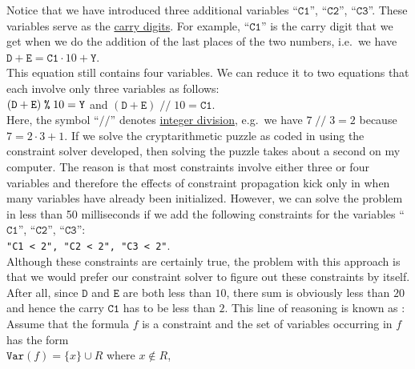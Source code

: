 Notice that we have introduced three additional variables ``$\texttt{C1}$'', ``$\texttt{C2}$'', ``$\texttt{C3}$''. 
These variables serve as the \href{https://en.wikipedia.org/wiki/Carry_(arithmetic)}{carry digits}.  For
example, ``$\texttt{C1}$'' is the carry digit that we get when we do the addition of the last places of the two
numbers, i.e.~we have
\\[0.2cm]
\hspace*{1.3cm}
$\texttt{D} + \texttt{E} = \texttt{C1} \cdot 10 + \texttt{Y}$.
\\[0.2cm]
This equation still contains four variables.  We can reduce it to two equations that each involve only three
variables as follows:
\\[0.2cm]
\hspace*{1.3cm}
$(\texttt{D} + \texttt{E})\; \texttt{\symbol{37}}\; 10 = \texttt{Y}$ \quad and \quad
$(\texttt{D} + \texttt{E}) \;\texttt{//}\; 10 = \texttt{C1}$.
\\[0.2cm]
Here, the symbol ``$\texttt{//}$'' denotes 
\href{https://en.wikipedia.org/wiki/Division_(mathematics)#Of_integers}{integer division}, 
e.g.~we have $7 \;\texttt{//}\; 3 = 2$ because $7 = 2 \cdot 3 + 1$.
If we solve the cryptarithmetic puzzle as coded in  using the
constraint solver developed, then solving the puzzle takes about
a second on my computer.  The reason is that most constraints involve either three or four variables and
therefore the effects of constraint propagation kick only in when many variables have already been initialized.
However, we can solve the problem in less than 50 milliseconds if we add the following constraints for the 
variables ``$\texttt{C1}$'', ``$\texttt{C2}$'', ``$\texttt{C3}$'':
\\[0.2cm]
\hspace*{1.3cm}
\texttt{"C1 < 2", "C2 < 2", "C3 < 2"}.
\\[0.2cm]
Although these constraints are certainly true, the problem with this approach is that we would prefer our
constraint solver to figure out these constraints by itself.  After all, since $\texttt{D}$ and
$\texttt{E}$ are both less than $10$, there sum is obviously less than $20$ and hence the carry $\texttt{C1}$
has to be less than $2$.  This line of reasoning is known as :
Assume that the formula $f$ is a constraint and the set of variables occurring in $f$ has the form
\\[0.2cm]
\hspace*{1.3cm}
$\texttt{Var}(f) = \{ x \} \cup R$ \quad where $x \not\in R$,

